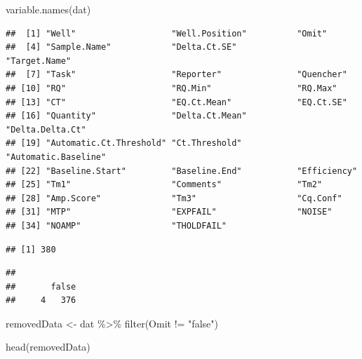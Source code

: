 \documentclass[
]{book}
\newenvironment{Shaded}{\begin{snugshade}}{\end{snugshade}}
\newcommand{\CommentTok}[1]{\textcolor[rgb]{0.56,0.35,0.01}{\textit{#1}}}
\newcommand{\FunctionTok}[1]{\textcolor[rgb]{0.00,0.00,0.00}{#1}}
\newcommand{\NormalTok}[1]{#1}
\newcommand{\OtherTok}[1]{\textcolor[rgb]{0.56,0.35,0.01}{#1}}
\newcommand{\SpecialCharTok}[1]{\textcolor[rgb]{0.00,0.00,0.00}{#1}}
\newcommand{\StringTok}[1]{\textcolor[rgb]{0.31,0.60,0.02}{#1}}
\begin{document}
\begin{Shaded}
\begin{Highlighting}[]
\FunctionTok{variable.names}\NormalTok{(dat)}
\end{Highlighting}
\end{Shaded}

\begin{verbatim}
##  [1] "Well"                   "Well.Position"          "Omit"                  
##  [4] "Sample.Name"            "Delta.Ct.SE"            "Target.Name"           
##  [7] "Task"                   "Reporter"               "Quencher"              
## [10] "RQ"                     "RQ.Min"                 "RQ.Max"                
## [13] "CT"                     "EQ.Ct.Mean"             "EQ.Ct.SE"              
## [16] "Quantity"               "Delta.Ct.Mean"          "Delta.Delta.Ct"        
## [19] "Automatic.Ct.Threshold" "Ct.Threshold"           "Automatic.Baseline"    
## [22] "Baseline.Start"         "Baseline.End"           "Efficiency"            
## [25] "Tm1"                    "Comments"               "Tm2"                   
## [28] "Amp.Score"              "Tm3"                    "Cq.Conf"               
## [31] "MTP"                    "EXPFAIL"                "NOISE"                 
## [34] "NOAMP"                  "THOLDFAIL"
\end{verbatim}

\begin{Shaded}
\end{Shaded}

\begin{verbatim}
## [1] 380
\end{verbatim}

\begin{Shaded}
\end{Shaded}

\begin{verbatim}
## 
##       false 
##     4   376
\end{verbatim}

\begin{Shaded}
\begin{Highlighting}[]
\NormalTok{removedData }\OtherTok{\textless{}{-}}\NormalTok{ dat }\SpecialCharTok{\%\textgreater{}\%}
  \FunctionTok{filter}\NormalTok{(Omit }\SpecialCharTok{!=} \StringTok{"false"}\NormalTok{)}

\FunctionTok{head}\NormalTok{(removedData)}
\end{Highlighting}
\end{Shaded}
\end{document}
